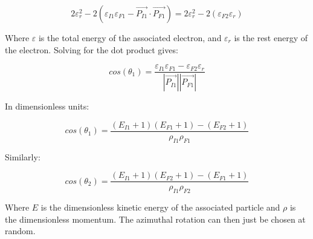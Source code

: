 \documentclass[]{article}
\begin{document}
\[ 
2\varepsilon_r^2 - 2(\varepsilon_{I1}\varepsilon_{F1}- \vec{P_{I1}}\cdot\vec{P_{F1}})=2\varepsilon_r^2 - 2(\varepsilon_{F2}\varepsilon_r)
\] 

Where $\varepsilon$ is the total energy of the associated electron, and $\varepsilon_r$ is the rest energy of the electron. Solving for the dot product gives:

\[ 
cos(\theta_1)=\frac{\varepsilon_{I1}\varepsilon_{F1}-\varepsilon_{F2}\varepsilon_r}{ \left| \vec{P_{I1}} \right| \left| \vec{P_{F1}} \right|  }
 \]
 
In dimensionless units:

\begin{equation}
cos(\theta_1)=\frac{(E_{I1}+1)(E_{F1}+1)-(E_{F2}+1)}{\rho_{I1}\rho_{F1}}
\end{equation}

Similarly:

\begin{equation}
cos(\theta_2)=\frac{(E_{I1}+1)(E_{F2}+1)-(E_{F1}+1)}{\rho_{I1}\rho_{F2}}
\end{equation}

Where $E$ is the dimensionless kinetic energy of the associated particle and $\rho$ is the dimensionless momentum. The azimuthal rotation can then just be chosen at random.
\end{document}
